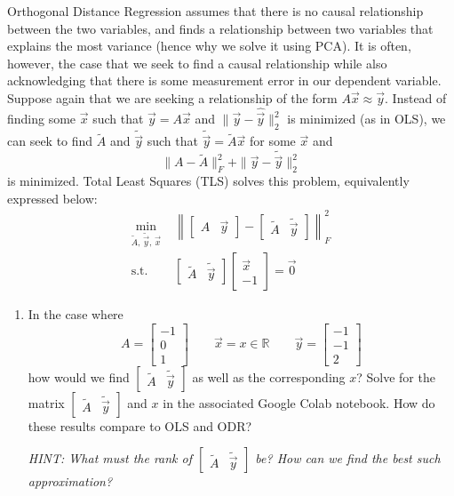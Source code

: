 \documentclass[10pt]{article}
\newcommand{\RR}{\mathbb{R}}
\begin{document}
Orthogonal Distance Regression assumes that there is no causal relationship between the two variables, and finds a relationship between two variables that explains the most variance (hence why we solve it using PCA). It is often, however, the case that we seek to find a causal relationship while also acknowledging that there is some measurement error in our dependent variable. Suppose again that we are seeking a relationship of the form $A\vec{x} \approx \vec{y}$. Instead of finding some $\vec{x}$ such that $\hat{\vec{y}} = A\vec{x}$ and $\|\vec{y} - \hat{\vec{y}}\|_2^2$ is minimized (as in OLS), we can seek to find $\tilde{A}$ and $\tilde{\vec{y}}$ such that $\tilde{\vec{y}} = \tilde{A}\vec{x}$ for some $\vec{x}$ and
\[
\|A - \tilde{A}\|_F^2 + \|\vec{y} - \tilde{\vec{y}}\|_2^2
\]
is minimized. Total Least Squares (TLS) solves this problem, equivalently expressed below:
\begin{align}
\min_{\tilde{A},\,\tilde{\vec{y}},\,\vec{x}} &\;\left\| \begin{bmatrix} A & \vec{y} \end{bmatrix} - \begin{bmatrix} \tilde{A} & \tilde{\vec{y}} \end{bmatrix} \right\|_F^2 \\
\text{s.t.} &\;\begin{bmatrix} \tilde{A} & \tilde{\vec{y}} \end{bmatrix} \begin{bmatrix} \vec{x} \\ -1 \end{bmatrix} = \vec{0}
\end{align}

\begin{enumerate}[label=(\alph*), resume]
\item In the case where
\[
A = \begin{bmatrix} -1 \\ 0 \\ 1 \end{bmatrix} \qquad \vec{x} = x \in \RR \qquad \vec{y} = \begin{bmatrix} -1 \\ -1 \\ 2 \end{bmatrix}
\]
how would we find $\begin{bmatrix} \tilde{A} & \tilde{\vec{y}} \end{bmatrix}$ as well as the corresponding $x$? Solve for the matrix $\begin{bmatrix} \tilde{A} & \tilde{\vec{y}} \end{bmatrix}$ and $x$ in the associated Google Colab notebook. How do these results compare to OLS and ODR?

\textit{HINT: What must the rank of $\begin{bmatrix} \tilde{A} & \tilde{\vec{y}} \end{bmatrix}$ be? How can we find the best such approximation?}
\end{enumerate}
\end{document}
